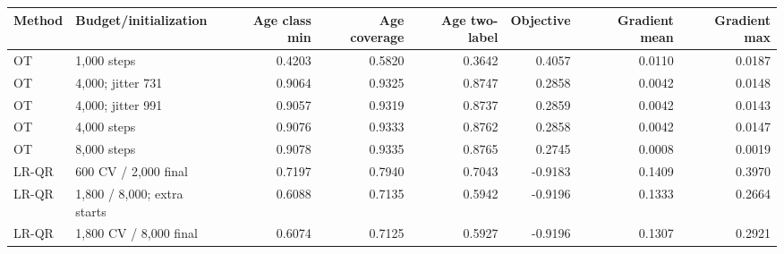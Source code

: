 \begin{tabular}{llrrrrrr}
\toprule
Method & Budget/initialization & Age class min & Age coverage & Age two-label & Objective & Gradient mean & Gradient max \\
\midrule
OT & 1,000 steps & 0.4203 & 0.5820 & 0.3642 & 0.4057 & 0.0110 & 0.0187 \\
OT & 4,000; jitter 731 & 0.9064 & 0.9325 & 0.8747 & 0.2858 & 0.0042 & 0.0148 \\
OT & 4,000; jitter 991 & 0.9057 & 0.9319 & 0.8737 & 0.2859 & 0.0042 & 0.0143 \\
OT & 4,000 steps & 0.9076 & 0.9333 & 0.8762 & 0.2858 & 0.0042 & 0.0147 \\
OT & 8,000 steps & 0.9078 & 0.9335 & 0.8765 & 0.2745 & 0.0008 & 0.0019 \\
LR-QR & 600 CV / 2,000 final & 0.7197 & 0.7940 & 0.7043 & -0.9183 & 0.1409 & 0.3970 \\
LR-QR & 1,800 / 8,000; extra starts & 0.6088 & 0.7135 & 0.5942 & -0.9196 & 0.1333 & 0.2664 \\
LR-QR & 1,800 CV / 8,000 final & 0.6074 & 0.7125 & 0.5927 & -0.9196 & 0.1307 & 0.2921 \\
\bottomrule
\end{tabular}
